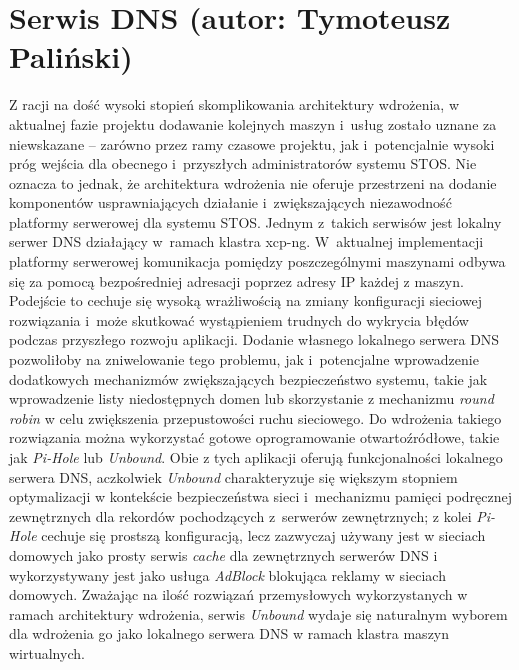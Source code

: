 \section{Serwis DNS (autor: Tymoteusz Paliński)}
Z racji na dość wysoki stopień skomplikowania architektury wdrożenia, w aktualnej fazie projektu dodawanie kolejnych maszyn i~usług zostało uznane za niewskazane -- zarówno przez ramy czasowe projektu, jak i~potencjalnie wysoki próg wejścia dla obecnego i~przyszłych administratorów systemu STOS. Nie oznacza to jednak, że architektura wdrożenia nie oferuje przestrzeni na dodanie komponentów usprawniających działanie i~zwiększających niezawodność platformy serwerowej dla systemu STOS.
\newline \noindent Jednym z~takich serwisów jest lokalny serwer DNS działający w~ramach klastra xcp-ng. W~aktualnej
implementacji platformy serwerowej komunikacja pomiędzy poszczególnymi maszynami odbywa się za pomocą bezpośredniej adresacji poprzez adresy IP każdej z maszyn. Podejście to cechuje się wysoką wrażliwością na zmiany konfiguracji sieciowej rozwiązania i~może skutkować wystąpieniem trudnych do wykrycia błędów podczas przyszłego rozwoju aplikacji. Dodanie własnego lokalnego serwera DNS pozwoliłoby na zniwelowanie tego problemu, jak i~potencjalne wprowadzenie dodatkowych mechanizmów zwiększających bezpieczeństwo systemu, takie jak wprowadzenie listy niedostępnych domen lub skorzystanie z mechanizmu \textit{round robin} w celu zwiększenia przepustowości ruchu sieciowego\cite{roundRobin}.
\newline \noindent Do wdrożenia takiego rozwiązania można wykorzystać gotowe oprogramowanie otwartoźródłowe, takie jak \textit{Pi-Hole} lub \textit{Unbound}\cite{pihole, unboundDns}. Obie z tych aplikacji oferują funkcjonalności lokalnego serwera DNS, aczkolwiek \textit{Unbound} charakteryzuje się większym stopniem optymalizacji w kontekście bezpieczeństwa sieci i~mechanizmu pamięci podręcznej zewnętrznych dla rekordów pochodzących z~serwerów zewnętrznych; z kolei \textit{Pi-Hole} cechuje się prostszą konfiguracją, lecz zazwyczaj używany jest w sieciach domowych jako prosty serwis \textit{cache} dla zewnętrznych serwerów DNS i wykorzystywany jest jako usługa \textit{AdBlock} blokująca reklamy w sieciach domowych. Zważając na ilość rozwiązań przemysłowych wykorzystanych w ramach architektury wdrożenia, serwis \textit{Unbound} wydaje się naturalnym wyborem dla wdrożenia go jako lokalnego serwera DNS w ramach klastra maszyn wirtualnych.


